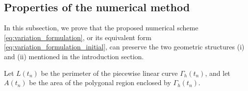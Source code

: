 \documentclass[review]{elsarticle}
\newtheorem{remark}{Remark}
\def\d{{\mathrm d}}
\begin{document}



\subsection{Properties of the numerical method}
In this subsection, we prove that the proposed numerical scheme \eqref{eq:variation_formulation}, or its equivalent form \eqref{eq:variation_formulation_initial}, can preserve the two geometric structures (i) and (ii) mentioned in the introduction section.


Let $L(t_n)$ be the perimeter of the piecewise linear curve $\Gamma_h(t_n)$, and let $A(t_n)$ be the area of the polygonal region enclosed by $\Gamma_h(t_n)$.
\end{document}
